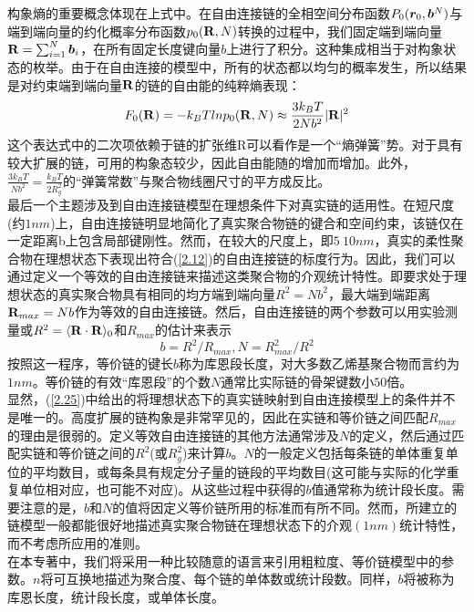 构象熵的重要概念体现在上式中。在自由连接链的全相空间分布函数$P_0(\bm{r}_0,\bm{b}^{N})$与端到端向量的约化概率分布函数$p_0(\mathbf{R},N)$转换的过程中，我们固定端到端向量$\mathbf{R}=\sum _{i=1}^{N} \bm{b}_{i}$，在所有固定长度键向量$b$上进行了积分。这种集成相当于对构象状态的枚举。由于在自由连接的模型中，所有的状态都以均匀的概率发生，所以结果是对约束端到端向量$\mathbf{R}$的链的自由能的纯粹熵表现：\\
\begin{equation}
F_0(\mathbf{R})=-k_{B}Tlnp_0(\mathbf{R},N)\approx \frac{3k_{B}T}{2Nb^2}|\mathbf{R}|^2
\label{2.24}
\end{equation}
这个表达式中的二次项依赖于链的扩张维R可以看作是一个“熵弹簧”势。对于具有较大扩展的链，可用的构象态较少，因此自由能随的增加而增加。此外，$\frac{3k_{B}T}{Nb^2}=\frac{k_{B}T}{2R^2_{g}}$的“弹簧常数”与聚合物线圈尺寸的平方成反比。\\

最后一个主题涉及到自由连接链模型在理想条件下对真实链的适用性。在短尺度(约$1nm$)上，自由连接链明显地简化了真实聚合物链的键合和空间约束，该链仅在一定距离b上包含局部键刚性。然而，在较大的尺度上，即$5~10nm$，真实的柔性聚合物在理想状态下表现出符合(\ref{2.12})的自由连接链的标度行为。因此，我们可以通过定义一个等效的自由连接链来描述这类聚合物的介观统计特性。即要求处于理想状态的真实聚合物具有相同的均方端到端向量$R^2=Nb^2$，最大端到端距离$\mathbf{R}_{max}=Nb$作为等效的自由连接链。然后，自由连接链的两个参数可以用实验测量或$R^2=\langle \mathbf{R} \cdot \mathbf{R}\rangle_{0}$和$R_{max}$的估计来表示\\
\begin{equation}
b=R^2/R_{max},N=R_{max}^{2}/R^2
\label{2.25}
\end{equation}
按照这一程序，等价链的键长$b$称为库恩段长度，对大多数乙烯基聚合物而言约为$1nm$。等价链的有效“库恩段”的个数$N$通常比实际链的骨架键数小$50$倍。\\

显然，(\ref{2.25})中给出的将理想状态下的真实链映射到自由连接模型上的条件并不是唯一的。高度扩展的链构象是非常罕见的，因此在实链和等价链之间匹配$R_{max}$的理由是很弱的。定义等效自由连接链的其他方法通常涉及$N$的定义，然后通过匹配实链和等价链之间的$R^2$(或$R_{g}^{2}$)来计算$b$。$N$的一般定义包括每条链的单体重复单位的平均数目，或每条具有规定分子量的链段的平均数目(这可能与实际的化学重复单位相对应，也可能不对应)。从这些过程中获得的$b$值通常称为统计段长度。需要注意的是，$b$和$N$的值将因定义等价链所用的标准而有所不同。然而，所建立的链模型一般都能很好地描述真实聚合物链在理想状态下的介观$(1nm)$统计特性，而不考虑所应用的准则。\\

在本专著中，我们将采用一种比较随意的语言来引用粗粒度、等价链模型中的参数。$n$将可互换地描述为聚合度、每个链的单体数或统计段数。同样，$b$将被称为库恩长度，统计段长度，或单体长度。\\



\endinput
